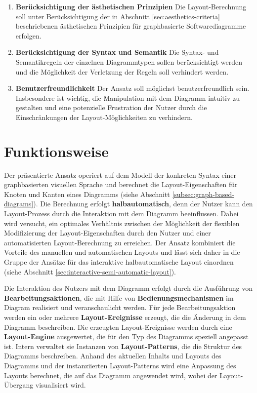 \begin{enumerate}[label={K.\arabic*}]
\item
\label{req:aesthetics-criteria}
\textbf{Berücksichtigung der ästhetischen Prinzipien}
Die Layout-Berechnung soll unter Berücksichtigung der in Abschnitt \ref{sec:aesthetics-criteria} beschriebenen ästhetischen Prinzipien für graphbasierte Softwarediagramme erfolgen.

\item
\label{req:syntax-and-semantics}
\textbf{Berücksichtigung der Syntax und Semantik}
Die Syntax- und Semantikregeln der einzelnen Diagrammtypen sollen berücksichtigt werden und die Möglichkeit der Verletzung der Regeln soll verhindert werden.

\item
\label{req:user-friendly}
\textbf{Benutzerfreundlichkeit}
Der Ansatz soll möglichst benutzerfreundlich sein. Insbesondere ist wichtig, die Manipulation mit dem Diagramm intuitiv zu gestalten und eine potenzielle Frustration der Nutzer durch die Einschränkungen der Layout-Möglichkeiten zu verhindern.

\end{enumerate}


\section{Funktionsweise}
\label{sec:functionality}

Der präsentierte Ansatz operiert auf dem Modell der konkreten Syntax einer graphbasierten visuellen Sprache und berechnet die Layout-Eigenschaften für Knoten und Kanten eines Diagramms (siehe Abschnitt \ref{subsec:graph-based-diagrams}). Die Berechnung erfolgt \textbf{halbautomatisch}, denn der Nutzer kann den Layout-Prozess durch die Interaktion mit dem Diagramm beeinflussen. Dabei wird versucht, ein optimales Verhältnis zwischen der Möglichkeit der flexiblen Modifizierung der Layout-Eigenschaften durch den Nutzer und einer automatisierten Layout-Berechnung zu erreichen. Der Ansatz kombiniert die Vorteile des manuellen und automatischen Layouts und lässt sich daher in die Gruppe der Ansätze für das interaktive halbautomatische Layout einordnen (siehe Abschnitt \ref{sec:interactive-semi-automatic-layout}).

Die Interaktion des Nutzers mit dem Diagramm erfolgt durch die Ausführung von \textbf{Bearbeitungsaktionen}, die mit Hilfe von \textbf{Bedienungsmechanismen} im Diagram realisiert und veranschaulicht werden. Für jede Bearbeitungsaktion werden ein oder mehrere \textbf{Layout-Ereignisse} erzeugt, die die Änderung in dem Diagramm beschreiben. Die erzeugten Layout-Ereignisse werden durch eine \textbf{Layout-Engine} ausgewertet, die für den Typ des Diagramms speziell angepasst ist. Intern verwaltet sie Instanzen von \textbf{Layout-Patterns}, die die Struktur des Diagramms beschreiben. Anhand des aktuellen Inhalts und Layouts des Diagramms und der instanziierten Layout-Patterns wird eine Anpassung des Layouts berechnet, die auf das Diagramm angewendet wird, wobei der Layout-Übergang visualisiert wird.

